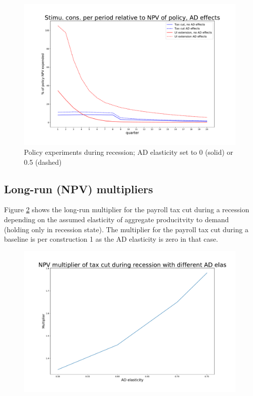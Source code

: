 \documentclass[]{article}
\begin{document}
\begin{figure}
	\centering
	\includegraphics[width=0.7\linewidth]{../UI_AD02/Stimulus_TaxCut_AD}
	\caption{Policy experiments during recession; AD elasticity set to 0 (solid) or 0.5 (dashed)}
	\label{fig:npvmultipliernoad}
\end{figure}


\FloatBarrier
\subsection{Long-run (NPV) multipliers}

Figure \ref{fig:longrunmultipliertaxcutsenselas} shows the long-run multiplier for the payroll tax cut during a recession depending on the assumed elasticity of aggregate producitvity to demand (holding only in recession state). The multiplier for the payroll tax cut during a baseline is per construction 1 as the AD elasticity is zero in that case.

\begin{figure}[h]
	\centering
	\includegraphics[width=\linewidth]{../Full_Run_Mar11_AD_Elas075/Longrun_Multiplier_TaxCut_SensElas}
	\caption{}
	\label{fig:longrunmultipliertaxcutsenselas}
\end{figure}
\end{document}
